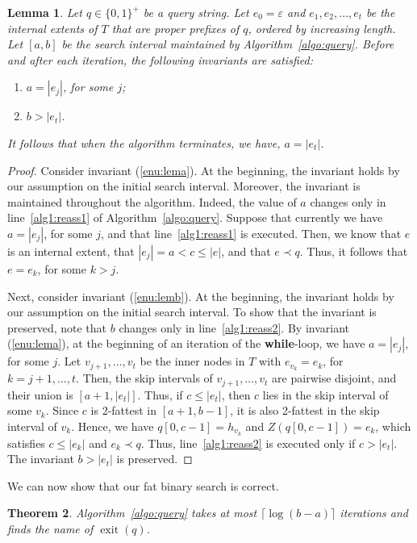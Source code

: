 \documentclass[a4paper,11pt]{article}
\newtheorem{theorem}{Theorem}[section]
\newtheorem{lemma}[theorem]{Lemma}
\newcommand{\eps}{\varepsilon}
\newcommand{\?}{\mskip1.5mu}
\DeclareMathOperator{\exit}{exit}
\begin{document}
\begin{lemma}\label{lem:correctness}
Let $q \in \{0, 1\}^+$ be a query string.
Let $e_0 = \eps$ and $e_1, e_2, \dots, e_t$ be the internal 
extents of $T$ that are \emph{proper} prefixes of $q$, ordered by 
increasing length.  Let $[a, b]$ be the search interval maintained by 
Algorithm~\ref{algo:query}. Before and after each iteration, the 
following invariants are satisfied: 
\begin{enumerate}
    \item\label{enu:lema} $a = |e_j|$, for some $j$;
    \item\label{enu:lemb} $b > |e_t|$.
\end{enumerate}
It follows that when the algorithm terminates, we have, $a = |e_t|$.
\end{lemma}

\begin{proof}
Consider invariant (\ref{enu:lema}).
At the beginning, the invariant holds
by our assumption on the initial search interval. 
Moreover, the invariant is maintained throughout
the algorithm. Indeed, the value of
$a$ changes only in line~\ref{alg1:reass1} of Algorithm~\ref{algo:query}. 
Suppose that currently we have $a = |e_j|$, for some $j$, and
that line~\ref{alg1:reass1} is executed. Then, we know that $e$ is an 
internal extent, that $|e_j| = a  < c  \leq |e|$, 
and that $e \prec q$. Thus, it follows that $e = e_k$, 
for some $k > j$.

Next, consider invariant (\ref{enu:lemb}).
At the beginning, the invariant holds 
by our assumption on the initial search interval.
To show that the invariant is preserved,
note that $b$ changes only in 
line~\ref{alg1:reass2}.
By invariant (\ref{enu:lema}), at the beginning of
an iteration of the \textbf{while}-loop, we have $a = |e_j|$, 
for some $j$.  
Let $v_{j+1}, \dots, v_{t}$ be the inner nodes in $T$ 
with $e_{v_k} = e_k$, for $k = j + 1, \dots, t$.
Then, the skip intervals of $v_{j+1}, \dots, v_t$ are 
pairwise disjoint, and their union is $[a + 1, |e_t|]$.
Thus, if $c \leq |e_t|$, then $c$ lies in the
skip interval of some $v_k$.
Since $c$ is 2-fattest in $[a + 1, b - 1]$, 
it is also 2-fattest in the skip interval of $v_k$. 
Hence, we have $q[0, c - 1] = h_{v_k}$ and 
$Z(q[0, c - 1]) = e_k$, 
which satisfies $c \leq |e_k|$ and $e_k  \prec q$. 
Thus, line~\ref{alg1:reass2} is executed only if $c > |e_t|$.
The invariant $b > |e_t|$ is preserved.
\end{proof}

We can now show that our fat binary search is correct.
\begin{theorem}
\label{thm:correctnessfbs}
Algorithm~\ref{algo:query} takes at most $\lceil\log(b-a)\rceil$
iterations
and finds the name of $\exit(q)$.
\end{theorem}
\end{document}
